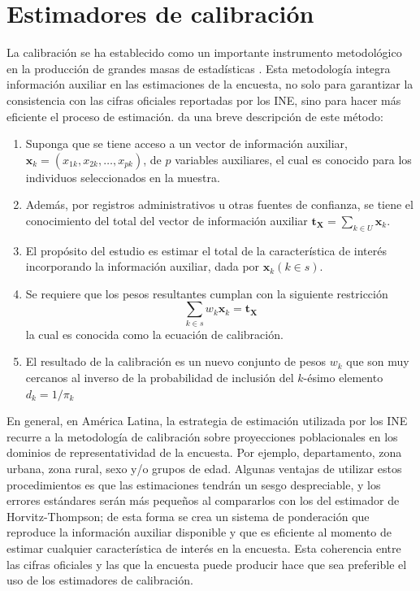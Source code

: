 \documentclass[
  12pt,
]{book}
\providecommand{\tightlist}{%
  \setlength{\itemsep}{0pt}\setlength{\parskip}{0pt}}
\begin{document}
\hypertarget{estimadores-de-calibraciuxf3n}{%
\section{Estimadores de calibración}\label{estimadores-de-calibraciuxf3n}}

La calibración se ha establecido como un importante instrumento metodológico en la producción de grandes masas de estadísticas \citep{Sar08}. Esta metodología integra información auxiliar en las estimaciones de la encuesta, no solo para garantizar la consistencia con las cifras oficiales reportadas por los INE, sino para hacer más eficiente el proceso de estimación. \citet{Gutierrez_2016} da una breve descripción de este método:

\begin{enumerate}
\def\labelenumi{\arabic{enumi}.}
\tightlist
\item
  Suponga que se tiene acceso a un vector de información auxiliar, \(\mathbf{x}_k=(x_{1k}, x_{2k},\ldots,x_{pk})\), de \(p\) variables auxiliares, el cual es conocido para los individuos seleccionados en la muestra.
\item
  Además, por registros administrativos u otras fuentes de confianza, se tiene el conocimiento del total del vector de información auxiliar \(\mathbf{t_X}=\sum_{k\in U}\mathbf{x}_k\).
\item
  El propósito del estudio es estimar el total de la característica de interés incorporando la información auxiliar, dada por \(\mathbf{x}_k (k\in s)\).
\item
  Se requiere que los pesos resultantes cumplan con la siguiente restricción
  \[
    \sum_{k\in s}w_k\mathbf{x}_k = \mathbf{t_X}
  \]
  la cual es conocida como la ecuación de calibración.
\item
  El resultado de la calibración es un nuevo conjunto de pesos \(w_k\) que son muy cercanos al inverso de la probabilidad de inclusión del \(k\)-ésimo elemento \(d_k=1/\pi_k\)
\end{enumerate}

En general, en América Latina, la estrategia de estimación utilizada por los INE recurre a la metodología de calibración sobre proyecciones poblacionales en los dominios de representatividad de la encuesta. Por ejemplo, departamento, zona urbana, zona rural, sexo y/o grupos de edad. Algunas ventajas de utilizar estos procedimientos es que las estimaciones tendrán un sesgo despreciable, y los errores estándares serán más pequeños al compararlos con los del estimador de Horvitz-Thompson; de esta forma se crea un sistema de ponderación que reproduce la información auxiliar disponible y que es eficiente al momento de estimar cualquier característica de interés en la encuesta. Esta coherencia entre las cifras oficiales y las que la encuesta puede producir hace que sea preferible el uso de los estimadores de calibración.
\end{document}
